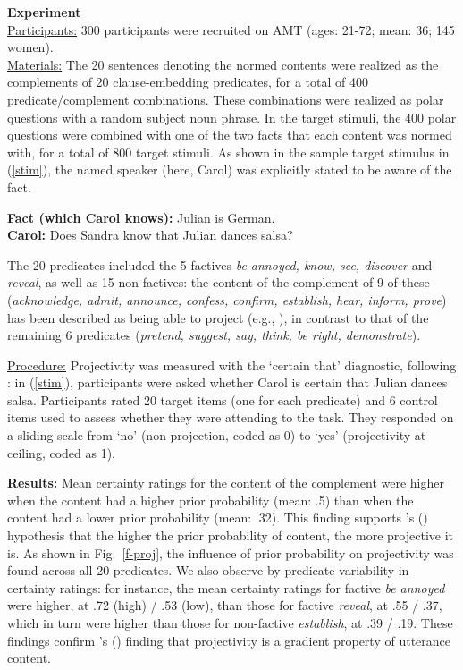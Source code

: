 \documentclass[12pt,fleqn]{article}
\newcommand{\citetpos}[1]{\citeauthor{#1}'s (\citeyear{#1})}
\newcommand{\6}{\mbox{$[\hspace*{-.6mm}[$}}
\newcommand{\9}{\mbox{$]\hspace*{-.6mm}]$}}
\begin{document}
\noindent 
{\bf Experiment} 
\\
\noindent
\underline{Participants:} 300 participants were recruited on AMT (ages: 21-72; mean: 36; 145 women).
\\
\noindent
\underline{Materials:} The 20 sentences denoting the normed contents were realized as the complements of 20 clause-embedding predicates, for a total of 400 predicate/complement combinations. These combinations were realized as polar questions with a random subject noun phrase. In the target stimuli, the 400 polar questions were combined with one of the two facts that each content was normed with, for a total of 800 target stimuli. As shown in the sample target stimulus in (\ref{stim}), the named speaker (here, Carol) was explicitly stated to be aware of the fact.
\vspace*{-.15cm}
\begin{exe}
\ex\label{stim}
{\bf Fact (which Carol knows):} Julian is German.  \\ 
{\bf Carol:} Does Sandra know that Julian dances salsa?
\end{exe}
\vspace*{-.15cm}
The 20 predicates included the 5 factives {\em be annoyed, know, see, discover} and {\em reveal}, as well as 15 non-factives: the content of the complement of 9 of these ({\em acknowledge, admit, announce, confess, confirm, establish, hear, inform, prove}) has been described as being able to project (e.g., \citealt{schlenker10,anand-hacquard2014,spector-egre2015,tbd-variability}), in contrast to that of the remaining 6 predicates ({\em pretend, suggest, say, think, be right, demonstrate}).

\noindent
\underline{Procedure:} Projectivity was measured with the `certain that' diagnostic, following \citealt{tbd-variability}: in (\ref{stim}), participants were asked whether Carol is certain that Julian dances salsa. Participants rated 20 target items (one for each predicate) and 6 control items used to assess whether they were attending to the task. They responded on a sliding scale from `no' (non-projection, coded as 0) to `yes' (projectivity at ceiling, coded as 1).

\noindent
{\bf Results:} Mean certainty ratings for the content of the complement were higher when the content had a higher prior probability (mean: .5) than when the content had a lower prior probability (mean: .32). This finding supports \citetpos{tbd-variability} hypothesis that the higher the prior probability of content, the more projective it is. As shown in Fig.~\ref{f-proj}, the influence of prior probability on projectivity was found across all 20 predicates. We also observe by-predicate variability in certainty ratings:  for instance, the mean certainty ratings for factive {\em be annoyed} were higher, at .72 (high) / .53 (low), than those for factive {\em reveal}, at .55 / .37, which in turn were higher than those for non-factive {\em establish}, at .39 / .19. These findings confirm \citetpos{tbd-variability} finding that projectivity is a gradient property of utterance content.
\end{document}
